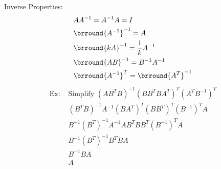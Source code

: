 Inverse Properties:
\begin{align*}
    &AA^{-1}=A^{-1}A=I\\
    &\brround{A^{-1}}^{-1}=A\\
    &\brround{kA}^{-1}=\frac{1}{k}A^{-1}\\
    &\brround{AB}^{-1}=B^{-1}A^{-1}\\
    &\brround{A^{-1}}^T=\brround{A^T}^{-1}
\end{align*}
\begin{align*}
    \text{Ex: }&\text{Simplify }(AB^TB)^{-1}(BB^TBA^T)^T(A^TB^{-1})^T\\
    &(B^TB)^{-1}A^{-1}(BA^T)^T(BB^T)^T(B^{-1})^TA\\
    &B^{-1}(B^T)^{-1}A^{-1}AB^TBB^T(B^{-1})^TA\\
    &B^{-1}(B^T)^{-1}B^TBA\\
    &B^{-1}BA\\
    &A
\end{align*}
